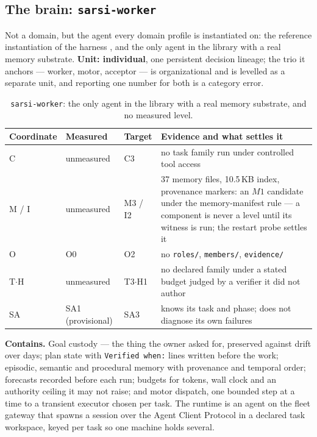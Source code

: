 \documentclass[11pt]{article}
\theoremstyle{definition}
\begin{document}
\subsection{The brain: \texttt{sarsi-worker}}\label{sec:worker}

Not a domain, but the agent every domain profile is instantiated on: the reference instantiation of the harness \citep{yang2026harness}, and the only agent in the library with a real memory substrate. \textbf{Unit: individual}, one persistent decision lineage; the trio it anchors --- worker, motor, acceptor --- is organizational and is levelled as a separate unit, and reporting one number for both is a category error.

\begin{table}[!htbp]
\centering\small
\begin{tabularx}{\textwidth}{@{}lllY@{}}
\toprule
Coordinate & Measured & Target & Evidence and what settles it \\
\midrule
C & unmeasured & C3 & no task family run under controlled tool access \\
M / I & unmeasured & M3 / I2 & 37 memory files, 10.5\,KB index, provenance markers: an $M1$ candidate under the memory-manifest rule --- a component is never a level until its witness is run; the restart probe settles it \\
O & O0 & O2 & no \texttt{roles/}, \texttt{members/}, \texttt{evidence/} \\
T$\cdot$H & unmeasured & T3$\cdot$H1 & no declared family under a stated budget judged by a verifier it did not author \\
SA & SA1 (provisional) & SA3 & knows its task and phase; does not diagnose its own failures \\
\bottomrule
\end{tabularx}
\caption{\texttt{sarsi-worker}: the only agent in the library with a real memory substrate, and no measured level.}
\label{tab:worker}
\end{table}

\textbf{Contains.} Goal custody --- the thing the owner asked for, preserved against drift over days; plan state with \texttt{Verified when:} lines written before the work; episodic, semantic and procedural memory with provenance and temporal order; forecasts recorded before each run; budgets for tokens, wall clock and an authority ceiling it may not raise; and motor dispatch, one bounded step at a time to a transient executor chosen per task. The runtime is an agent on the fleet gateway that spawns a session over the Agent Client Protocol in a declared task workspace, keyed per task so one machine holds several.
\end{document}
